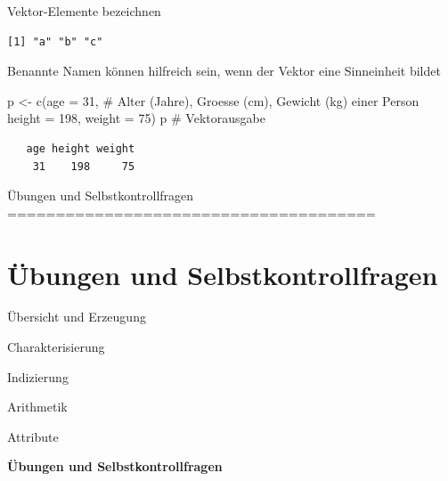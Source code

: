 \documentclass[
  8pt,
  ignorenonframetext,
]{beamer}
\newenvironment{Shaded}{\begin{snugshade}}{\end{snugshade}}
\newcommand{\AttributeTok}[1]{\textcolor[rgb]{0.40,0.45,0.13}{#1}}
\newcommand{\CommentTok}[1]{\textcolor[rgb]{0.37,0.37,0.37}{#1}}
\newcommand{\DecValTok}[1]{\textcolor[rgb]{0.68,0.00,0.00}{#1}}
\newcommand{\FunctionTok}[1]{\textcolor[rgb]{0.28,0.35,0.67}{#1}}
\newcommand{\NormalTok}[1]{\textcolor[rgb]{0.00,0.23,0.31}{#1}}
\newcommand{\OtherTok}[1]{\textcolor[rgb]{0.00,0.23,0.31}{#1}}
\begin{document}
\begin{frame}[fragile]{Vektor-Elemente bezeichnen}
\begin{verbatim}
[1] "a" "b" "c"
\end{verbatim}

\vspace{1.5mm}
\small

Benannte Namen können hilfreich sein, wenn der Vektor eine Sinneinheit
bildet \vspace{0.5mm} \tiny

\begin{Shaded}
\begin{Highlighting}[]
\NormalTok{p }\OtherTok{\textless{}{-}} \FunctionTok{c}\NormalTok{(}\AttributeTok{age    =} \DecValTok{31}\NormalTok{,          }\CommentTok{\# Alter (Jahre), Groesse (cm), Gewicht (kg) einer Person}
       \AttributeTok{height =} \DecValTok{198}\NormalTok{, }
       \AttributeTok{weight =} \DecValTok{75}\NormalTok{)}
\NormalTok{p                            }\CommentTok{\# Vektorausgabe}
\end{Highlighting}
\end{Shaded}

\begin{verbatim}
   age height weight 
    31    198     75 
\end{verbatim}
\end{frame}

\begin{frame}[plain]{Übungen und Selbstkontrollfragen
======================================}
\protect\hypertarget{uxfcbungen-und-selbstkontrollfragen}{}
\AtBeginSection{}
\section{Übungen und Selbstkontrollfragen}

\large
{}
\vfill

Übersicht und Erzeugung

Charakterisierung

Indizierung

Arithmetik

Attribute

\textbf{Übungen und Selbstkontrollfragen}
\end{frame}
\end{document}
